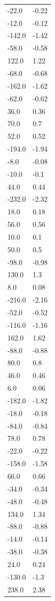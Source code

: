 \begin{longtable}{ll}
-22.0 & -0.22 \\
-12.0 & -0.12 \\
-142.0 & -1.42 \\
-58.0 & -0.58 \\
122.0 & 1.22 \\
-68.0 & -0.68 \\
-162.0 & -1.62 \\
-62.0 & -0.62 \\
36.0 & 0.36 \\
70.0 & 0.7 \\
52.0 & 0.52 \\
-194.0 & -1.94 \\
-8.0 & -0.08 \\
-10.0 & -0.1 \\
44.0 & 0.44 \\
-232.0 & -2.32 \\
18.0 & 0.18 \\
56.0 & 0.56 \\
10.0 & 0.1 \\
50.0 & 0.5 \\
-98.0 & -0.98 \\
130.0 & 1.3 \\
8.0 & 0.08 \\
-216.0 & -2.16 \\
-52.0 & -0.52 \\
-116.0 & -1.16 \\
162.0 & 1.62 \\
-88.0 & -0.88 \\
80.0 & 0.8 \\
46.0 & 0.46 \\
6.0 & 0.06 \\
-182.0 & -1.82 \\
-18.0 & -0.18 \\
-84.0 & -0.84 \\
78.0 & 0.78 \\
-22.0 & -0.22 \\
-158.0 & -1.58 \\
66.0 & 0.66 \\
-34.0 & -0.34 \\
-48.0 & -0.48 \\
134.0 & 1.34 \\
-88.0 & -0.88 \\
-14.0 & -0.14 \\
-38.0 & -0.38 \\
24.0 & 0.24 \\
-130.0 & -1.3 \\
238.0 & 2.38 \\

\end{longtable}
